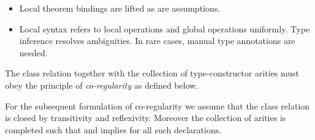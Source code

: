 \begin{isabellebody}
\begin{isamarkuptext}
\begin{itemize}
  \item Local theorem bindings are lifted as are assumptions.

  \item Local syntax refers to local operations  and
  global operations  uniformly.  Type inference
  resolves ambiguities.  In rare cases, manual type annotations are
  needed.
  
  \end{itemize}%
\end{isamarkuptext}%
\isamarkuptrue%
%
\isamarkuptrue%
%
\begin{isamarkuptext}%
The class relation together with the collection of
  type-constructor arities must obey the principle of
  \emph{co-regularity} as defined below.

  \medskip For the subsequent formulation of co-regularity we assume
  that the class relation is closed by transitivity and reflexivity.
  Moreover the collection of arities  is
  completed such that  and 
  implies  for all such declarations.


\end{isamarkuptext}
\end{isabellebody}
